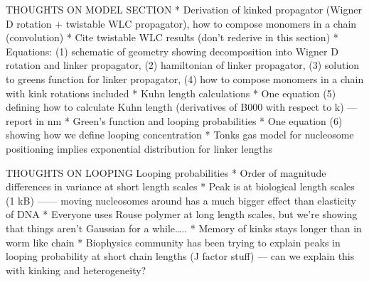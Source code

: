 \documentclass[%
 reprint,
superscriptaddress,
showpacs,preprintnumbers,
 amsmath,amssymb,
 aps,
 prl,
]{revtex4-1}
\begin{document}


THOUGHTS ON MODEL SECTION
* Derivation of kinked propagator (Wigner D rotation + twistable WLC
propagator), how to compose monomers in a chain (convolution)
    * Cite twistable WLC results (don’t rederive in this section)
        * Equations: (1) schematic of geometry showing decomposition into Wigner
        D rotation and linker propagator, (2) hamiltonian of linker propagator,
        (3) solution to greens function for linker propagator, (4) how to
        compose monomers in a chain with kink rotations included
        * Kuhn length calculations
            * One equation (5) defining how to calculate Kuhn length
            (derivatives of B000 with respect to k) — report in nm
            * Green’s function and looping probabilities
                * One equation (6) showing how we define looping concentration
                * Tonks gas model for nucleosome positioning implies exponential
                distribution for linker lengths

THOUGHTS ON LOOPING
Looping probabilities
* Order of magnitude differences in variance at short length scales
* Peak is at biological length scales (1 kB) —— moving nucleosomes around has a
much bigger effect than elasticity of DNA
* Everyone uses Rouse polymer at long length scales, but we’re showing that
things aren’t Gaussian for a while…..
    * Memory of kinks stays longer than in worm like chain
    * Biophysics community has been trying to explain peaks in looping
    probability at short chain lengths (J factor stuff) — can we explain this
    with kinking and heterogeneity?
\end{document}
